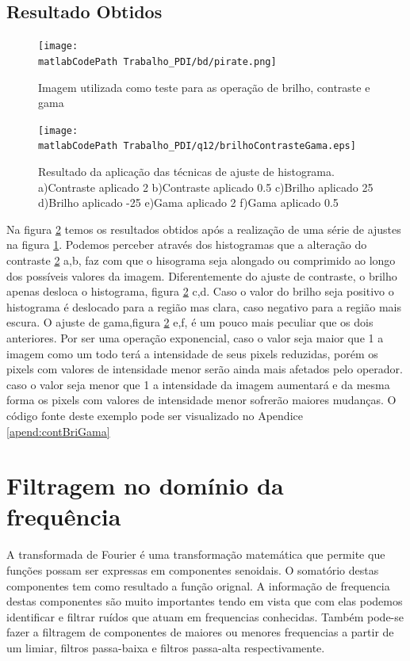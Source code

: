 \documentclass[
	article,			%
	11pt,				%
	oneside,			%
	a4paper,			%
	english,			%
	brazil,				%
	sumario=tradicional
	]{abntex2}
\newcommand{\matlabCodePath}{/home/clifte/git/Mestrado/Matlab/}
\begin{document}
\subsection{Resultado Obtidos}

\begin{figure} 
		\centering
		\texttt{[image: \\matlabCodePath
		Trabalho\_PDI/bd/pirate.png]}
		\caption{Imagem utilizada como teste para as operação de brilho, contraste e
		gama}
		\label{fig:BrilhoContGamaOriginal}
\end{figure}

\begin{figure} 
		\centering 
		\texttt{[image: \\matlabCodePath
		Trabalho\_PDI/q12/brilhoContrasteGama.eps]}
		\caption{Resultado da aplicação das técnicas de ajuste de histograma.
		a)Contraste aplicado 2
		b)Contraste aplicado 0.5
		c)Brilho aplicado 25
		d)Brilho aplicado -25
		e)Gama aplicado 2
		f)Gama aplicado 0.5 
		}
		\label{fig:brilhContGamaRes}		
\end{figure}

Na figura \ref{fig:brilhContGamaRes} temos os resultados obtidos após a
realização de uma série de ajustes na figura \ref{fig:BrilhoContGamaOriginal}.
Podemos perceber através dos histogramas que a alteração do contraste
\ref{fig:brilhContGamaRes} a,b,  faz com que o hisograma seja alongado ou
comprimido ao longo dos possíveis valores da imagem. Diferentemente do ajuste
de contraste, o brilho apenas desloca o histograma,
figura \ref{fig:brilhContGamaRes} c,d. Caso o valor do brilho seja positivo o
histograma é deslocado para a região mas clara, caso negativo para a região mais
escura. O ajuste de gama,figura \ref{fig:brilhContGamaRes} e,f, é um pouco mais
peculiar que os dois anteriores. Por ser uma operação exponencial, caso o valor seja maior que 1 a imagem como um
todo terá a intensidade de seus pixels reduzidas, porém os pixels com valores de
intensidade menor serão ainda mais afetados pelo operador. caso o valor seja
menor que 1 a intensidade da imagem aumentará e da mesma forma os pixels com
valores de intensidade menor sofrerão maiores mudanças. O código fonte deste
exemplo pode ser visualizado no Apendice \ref{apend:contBriGama}


\section{Filtragem no domínio da frequência}
A transformada de Fourier é uma transformação matemática que permite que funções
possam ser expressas em componentes senoidais. O somatório destas componentes
tem como resultado a função orignal. A informação de frequencia destas
componentes são muito importantes tendo em vista que com elas podemos
identificar e filtrar ruídos que atuam em frequencias conhecidas. Também pode-se
fazer a filtragem de componentes de maiores ou menores frequencias a partir de
um limiar, filtros passa-baixa e filtros passa-alta respectivamente.
\end{document}
